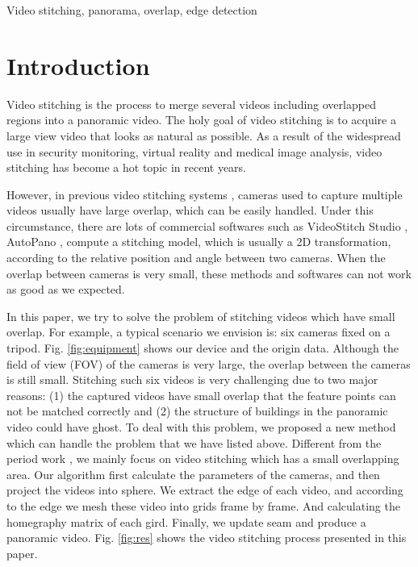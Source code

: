 \documentclass[conference]{IEEEtran}
\begin{document}
\begin{IEEEkeywords}
Video stitching, panorama, overlap, edge detection
\end{IEEEkeywords}

\section{Introduction}
\label{sec:intro}

Video stitching is the process to merge several videos
including overlapped regions into a panoramic video. The
holy goal of video stitching is to acquire a large view video
that looks as natural as possible. As a result of the widespread
use in security monitoring, virtual reality and medical image
analysis, video stitching has become a hot topic in recent years.

However, in previous video stitching systems \cite{zheng2008stitching, guo2016joint, Jiang_2015_CVPR_Workshops, nie2018dynamic},
cameras used to capture multiple videos usually have large overlap, which can be easily handled.
Under this circumstance, there are lots of commercial softwares such as VideoStitch Studio \cite{videostitching}, AutoPano \cite{autopano},
compute a stitching model, which is usually a 2D transformation,
according to the relative position and angle between two cameras. 
When the overlap between cameras is very small, these methods and softwares can
not work as good as we expected.

In this paper, we try to solve the problem of stitching videos which have small overlap. 
For example, a typical scenario we envision is: six cameras fixed on 
a tripod. Fig. \ref{fig:equipment} shows our device and the origin data. Although the field of view (FOV) of the cameras is very large, the overlap between the 
cameras is still small. Stitching such six videos is very challenging due to two
major reasons: (1) the captured videos have small overlap that the feature points can not be matched correctly 
and (2) the structure of buildings in the panoramic video could have ghost.
To deal with this problem, we proposed a new method which can handle the problem that we have listed above.
Different from the period work \cite{Jiang_2015_CVPR_Workshops}, we mainly focus on video stitching which has a small overlapping area.
Our algorithm first calculate the parameters of the cameras, and then project
the videos into sphere. We extract the edge of each video, and according to the edge we mesh these video into grids frame by frame.
And calculating the homegraphy matrix of each gird. Finally, we update seam and produce a panoramic video.
Fig. \ref{fig:res} shows the video stitching process presented in this paper.
\end{document}
